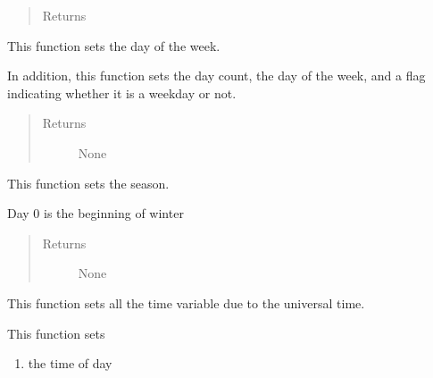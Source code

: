 \documentclass[letterpaper,10pt,english]{sphinxmanual}
\begin{document}
\begin{fulllineitems}
\begin{fulllineitems}
\begin{quote}
\begin{description}
\item[{Returns}] \leavevmode


\end{description}\end{quote}

\end{fulllineitems}


\begin{fulllineitems}
\label{temporal:temporal.Temporal.set_day_of_week}
This function sets the day of the week.

In addition, this function sets the day count, the day of the week, and a flag indicating whether it         is a weekday or not.
\begin{quote}\begin{description}
\item[{Returns}] \leavevmode
None

\end{description}\end{quote}

\end{fulllineitems}


\begin{fulllineitems}
\label{temporal:temporal.Temporal.set_season}
This function sets the season.

Day 0 is the beginning of winter
\begin{quote}\begin{description}
\item[{Returns}] \leavevmode
None

\end{description}\end{quote}

\end{fulllineitems}


\begin{fulllineitems}
\label{temporal:temporal.Temporal.set_time}
This function sets all the time variable due to the universal time.

This function sets
\begin{enumerate}
\item {} 
the time of day


\end{enumerate}
\end{fulllineitems}
\end{fulllineitems}
\end{document}
